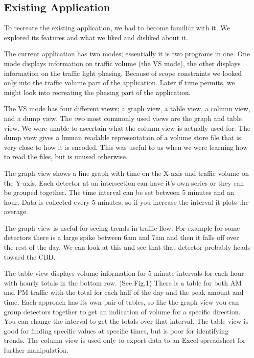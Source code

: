 \documentclass{article}
\begin{document}
\subsection{Existing Application}
To recreate the existing application, we had to become
familiar with it. We explored its features and what we liked
and disliked about it.

The current application has two modes; essentially it is two
programs in one. One mode displays information on traffic
volume (the VS mode), the other displays information on the
traffic light phasing. Because of scope constraints we looked
only into the traffic volume part of the application. Later if
time permits, we might look into recreating the phasing part of
the application.

The VS mode has four different views; a graph view, a
table view, a column view, and a dump view. The two most
commonly used views are the graph and table view. We were
unable to ascertain what the column view is actually used for.
The dump view gives a human readable representation of a
volume store file that is very close to how it is encoded. This
was useful to us when we were learning how to read the files,
but is unused otherwise.

The graph view shows a line graph with time on the X-axis
and traffic volume on the Y-axis. Each detector at an
intersection can have it’s own series or they can be grouped
together. The time interval can be set between 5 minutes and
an hour. Data is collected every 5 minutes, so if you increase
the interval it plots the average.

The graph view is useful for seeing trends in traffic flow.
For example for some detectors there is a large spike between
6am and 7am and then it falls off over the rest of the day. We
can look at this and see that that detector probably heads
toward the CBD.

The table view displays volume information for 5-minute
intervals for each hour with hourly totals in the bottom row.
(See Fig.1) There is a table for both AM and PM traffic with
the total for each half of the day and the peak amount and
time. Each approach has its own pair of tables, so like the
graph view you can group detectors together to get an
indication of volume for a specific direction. You can change
the interval to get the totals over that interval.
The table view is good for finding specific values at
specific times, but is poor for identifying trends.
The column view is used only to export data to an Excel
spreadsheet for further manipulation.
\end{document}
